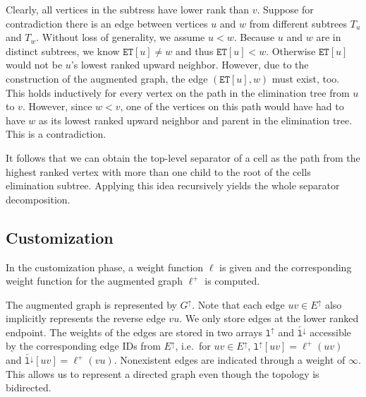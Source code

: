 \documentclass[a4paper, english, cleveref]{lipics-v2021}
\newcommand*{\gchu}{G^{\uparrow}}
\newcommand*{\echu}{E^{\uparrow}}
\newcommand*{\lchu}{\mathtt{l}^{\uparrow}}
\newcommand*{\rlchd}{\overleftarrow{\mathtt{l}^{\downarrow}}}
\begin{document}
Clearly, all vertices in the subtress have lower rank than $v$.
Suppose for contradiction there is an edge between vertices $u$ and $w$ from different subtrees $T_u$ and $T_w$.
Without loss of generality, we assume $u < w$.
Because $u$ and $w$ are in distinct subtrees, we know $\mathtt{ET}[u] \neq w$ and thus $\mathtt{ET}[u] < w$.
Otherwise $\mathtt{ET}[u]$ would not be $u$'s lowest ranked upward neighbor.
However, due to the construction of the augmented graph, the edge $(\mathtt{ET}[u], w)$ must exist, too.
This holds inductively for every vertex on the path in the elimination tree from $u$ to $v$.
However, since $w < v$, one of the vertices on this path would have had to have $w$ as its lowest ranked upward neighbor and parent in the elimination tree.
This is a contradiction.

It follows that we can obtain the top-level separator of a cell as the path from the highest ranked vertex with more than one child to the root of the cells elimination subtree.
Applying this idea recursively yields the whole separator decomposition.


\subsection{Customization}


In the customization phase, a weight function $\ell$ is given and the corresponding weight function for the augmented graph $\ell^+$ is computed.

The augmented graph is represented by $\gchu$.
Note that each edge $uv \in \echu$ also implicitly represents the reverse edge $vu$.
We only store edges at the lower ranked endpoint.
The weights of the edges are stored in two arrays $\lchu$ and $\rlchd$ accessible by the corresponding edge IDs from $\echu$, i.e.\ for $uv \in \echu$, $\lchu[uv] = \ell^+(uv)$ and $\rlchd[uv] = \ell^+(vu)$.
Nonexistent edges are indicated through a weight of $\infty$.
This allows us to represent a directed graph even though the topology is bidirected.
\end{document}
